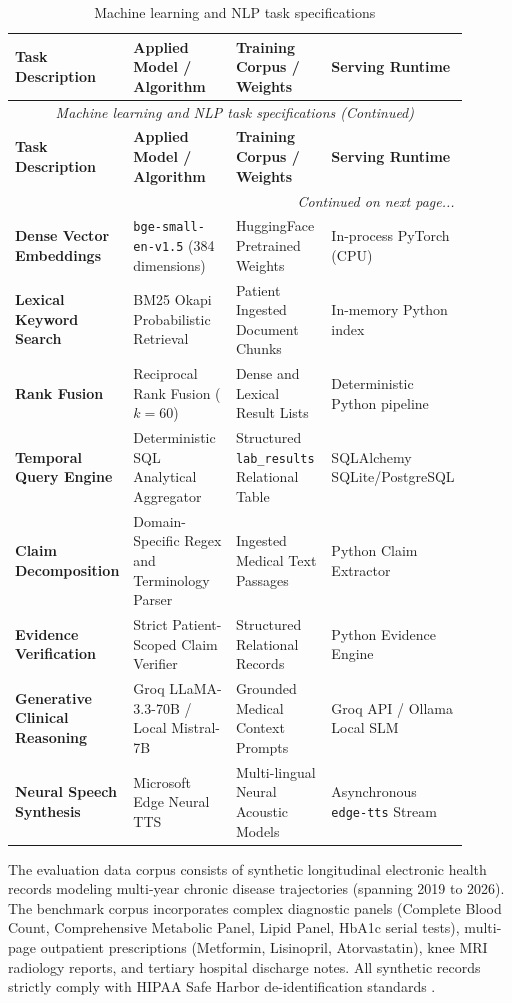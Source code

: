 \small
\begin{longtable}{@{}p{0.23\linewidth} p{0.27\linewidth} p{0.23\linewidth} p{0.17\linewidth}@{}}
\caption{Machine learning and NLP task specifications}\label{tab:6_1} \\
\toprule
\textbf{Task Description} & \textbf{Applied Model / Algorithm} & \textbf{Training Corpus / Weights} & \textbf{Serving Runtime} \\
\midrule
\endfirsthead
\toprule
\multicolumn{4}{c}{\small\textit{Machine learning and NLP task specifications (Continued)}} \\[4pt]
\midrule
\textbf{Task Description} & \textbf{Applied Model / Algorithm} & \textbf{Training Corpus / Weights} & \textbf{Serving Runtime} \\
\midrule
\endhead
\midrule
\multicolumn{4}{r}{\footnotesize\textit{Continued on next page...}} \\
\bottomrule
\endfoot
\bottomrule
\endlastfoot
\textbf{Dense Vector Embeddings} & \texttt{bge-small-en-v1.5} (384 dimensions) & HuggingFace Pretrained Weights & In-process PyTorch (CPU) \\
\textbf{Lexical Keyword Search} & BM25 Okapi Probabilistic Retrieval & Patient Ingested Document Chunks & In-memory Python index \\
\textbf{Rank Fusion} & Reciprocal Rank Fusion ($k=60$) & Dense and Lexical Result Lists & Deterministic Python pipeline \\
\textbf{Temporal Query Engine} & Deterministic SQL Analytical Aggregator & Structured \texttt{lab\_results} Relational Table & SQLAlchemy SQLite/PostgreSQL \\
\textbf{Claim Decomposition} & Domain-Specific Regex and Terminology Parser & Ingested Medical Text Passages & Python Claim Extractor \\
\textbf{Evidence Verification} & Strict Patient-Scoped Claim Verifier & Structured Relational Records & Python Evidence Engine \\
\textbf{Generative Clinical Reasoning} & Groq LLaMA-3.3-70B / Local Mistral-7B & Grounded Medical Context Prompts & Groq API / Ollama Local SLM \\
\textbf{Neural Speech Synthesis} & Microsoft Edge Neural TTS & Multi-lingual Neural Acoustic Models & Asynchronous \texttt{edge-tts} Stream \\
\end{longtable}
\normalsize

The evaluation data corpus consists of synthetic longitudinal electronic health records modeling multi-year chronic disease trajectories (spanning 2019 to 2026). The benchmark corpus incorporates complex diagnostic panels (Complete Blood Count, Comprehensive Metabolic Panel, Lipid Panel, HbA1c serial tests), multi-page outpatient prescriptions (Metformin, Lisinopril, Atorvastatin), knee MRI radiology reports, and tertiary hospital discharge notes. All synthetic records strictly comply with HIPAA Safe Harbor de-identification standards \cite{nha2022abdm}.

